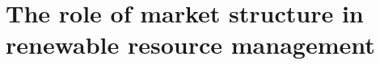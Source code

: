 \documentclass[a4paper, twoside, 11pt]{report}
\begin{document}
	\part{The role of market structure in renewable resource management}	
	\renewcommand{\thesection}{\arabic{section}}
	\renewcommand{\thesubsection}{\arabic{subsection}}
	\renewcommand{\thefigure}{4.\arabic{figure}}
	\renewcommand{\thetable}{4.\arabic{table}}
	
	\clearpage
	\begin{appendices}
	\setcounter{figure}{0}	
	\setcounter{equation}{0}
	\renewcommand{\thesection}{\Alph{section}}
	\renewcommand{\thefigure}{4.\Alph{figure}}
	\renewcommand{\thetable}{4. \Alph{table}}
	\renewcommand{\thesubsection}{\Alph{subsection}}
	
	\clearpage
	\end{appendices}	
    	
    	
	 
    \cleardoublepage
 	{\small
    
    }
    \clearpage
    
    
\end{document}
